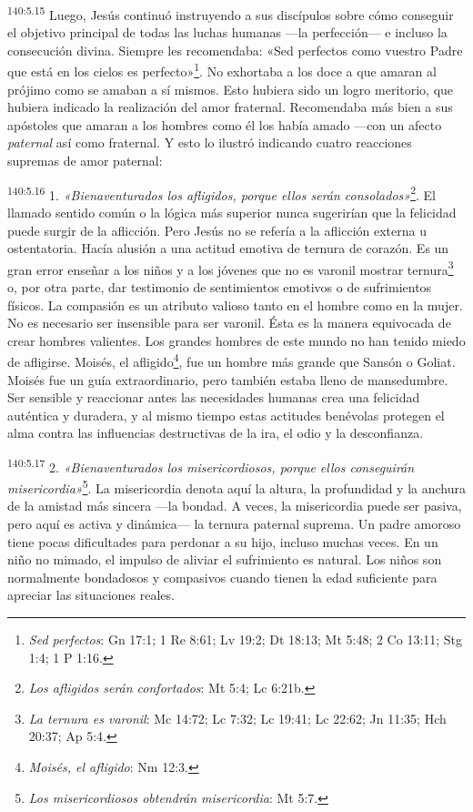\par 
\textsuperscript{140:5.15} Luego, Jesús continuó instruyendo a sus discípulos sobre cómo conseguir el objetivo principal de todas las luchas humanas ---la perfección--- e incluso la consecución divina. Siempre les recomendaba: «Sed perfectos como vuestro Padre que está en los cielos es perfecto»\footnote{\textit{Sed perfectos}: Gn 17:1; 1 Re 8:61; Lv 19:2; Dt 18:13; Mt 5:48; 2 Co 13:11; Stg 1:4; 1 P 1:16.}. No exhortaba a los doce a que amaran al prójimo como se amaban a sí mismos. Esto hubiera sido un logro meritorio, que hubiera indicado la realización del amor fraternal. Recomendaba más bien a sus apóstoles que amaran a los hombres como él los había amado ---con un afecto \textit{paternal} así como fraternal. Y esto lo ilustró indicando cuatro reacciones supremas de amor paternal:

\par 
\textsuperscript{140:5.16} 1. \textit{«Bienaventurados los afligidos, porque ellos serán consolados»}\footnote{\textit{Los afligidos serán confortados}: Mt 5:4; Lc 6:21b.}. El llamado sentido común o la lógica más superior nunca sugerirían que la felicidad puede surgir de la aflicción. Pero Jesús no se refería a la aflicción externa u ostentatoria. Hacía alusión a una actitud emotiva de ternura de corazón. Es un gran error enseñar a los niños y a los jóvenes que no es varonil mostrar ternura\footnote{\textit{La ternura es varonil}: Mc 14:72; Lc 7:32; Lc 19:41; Lc 22:62; Jn 11:35; Hch 20:37; Ap 5:4.} o, por otra parte, dar testimonio de sentimientos emotivos o de sufrimientos físicos. La compasión es un atributo valioso tanto en el hombre como en la mujer. No es necesario ser insensible para ser varonil. Ésta es la manera equivocada de crear hombres valientes. Los grandes hombres de este mundo no han tenido miedo de afligirse. Moisés, el afligido\footnote{\textit{Moisés, el afligido}: Nm 12:3.}, fue un hombre más grande que Sansón o Goliat. Moisés fue un guía extraordinario, pero también estaba lleno de mansedumbre. Ser sensible y reaccionar antes las necesidades humanas crea una felicidad auténtica y duradera, y al mismo tiempo estas actitudes benévolas protegen el alma contra las influencias destructivas de la ira, el odio y la desconfianza.

\par 
\textsuperscript{140:5.17} 2. \textit{«Bienaventurados los misericordiosos, porque ellos conseguirán misericordia»}\footnote{\textit{Los misericordiosos obtendrán misericordia}: Mt 5:7.}. La misericordia denota aquí la altura, la profundidad y la anchura de la amistad más sincera ---la bondad. A veces, la misericordia puede ser pasiva, pero aquí es activa y dinámica--- la ternura paternal suprema. Un padre amoroso tiene pocas dificultades para perdonar a su hijo, incluso muchas veces. En un niño no mimado, el impulso de aliviar el sufrimiento es natural. Los niños son normalmente bondadosos y compasivos cuando tienen la edad suficiente para apreciar las situaciones reales.

